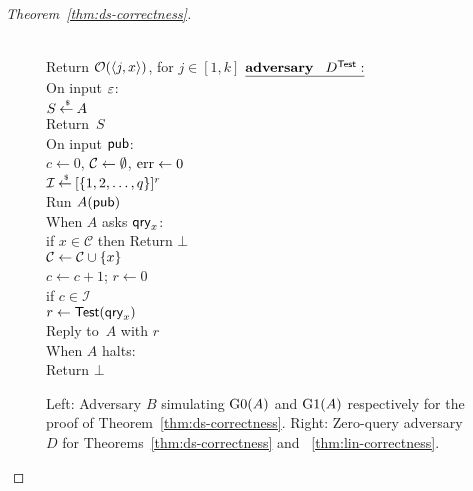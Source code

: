 \begin{proof}[Theorem~\ref{thm:ds-correctness}]
\begin{figure}
{{\medskip
{}\\
\nudge Return ${\cal O}(\langle j,x \rangle)$, for $j\in[1,k]$
}
{
${\underline{\textbf{adversary}\hspace*{2ex} {D^{\mathsf{Test}}}:}}$\\[4pt]
On input $\varepsilon$:\\
\nudge $S {\:\stackrel{{\scriptscriptstyle \hspace{0.2em}\$}} {\leftarrow}\:} A$\\
\nudge Return~$S$\\
On input ${\sf pub}$:\\
\nudge $c \gets 0$, ${\cal C} \gets \emptyset$, $\mathrm{err} \gets 0$\\
\nudge $\mathcal{I}{\:\stackrel{{\scriptscriptstyle \hspace{0.2em}\$}} {\leftarrow}\:} [\{1,2,\ldots,q\}]^r$\\
\nudge Run $A({\sf pub})$\\
\nudge When $A$ asks $\mathsf{qry}_x$:\\
\nudge\nudge if $x \in \mathcal{C}$ then Return $\bot$\\
\nudge\nudge ${\cal C} \gets {\cal C} \cup \{x\}$\\
\nudge\nudge $c \gets c+1$; $r \gets 0$\\
\nudge\nudge if $c \in \mathcal{I}$\\
\nudge\nudge \nudge $r \gets \mathsf{Test}(\mathsf{qry}_x)$\\
\nudge\nudge Reply to~$A$ with $r$\\
\nudge When $A$ halts:\\
\nudge\nudge Return $\bot$
}
}
\caption{Left: Adversary $B$ simulating $\text{G0}(A)$ and $\text{G1}(A)$ respectively for the
proof of Theorem~\ref{thm:ds-correctness}. Right: Zero-query adversary $D$ for Theorems~\ref{thm:ds-correctness} and ~\ref{thm:lin-correctness}.}\label{fig:ds-correctness-adv}\label{fig:lin-correctness-zq-adv}
\end{figure}	

\end{proof}
